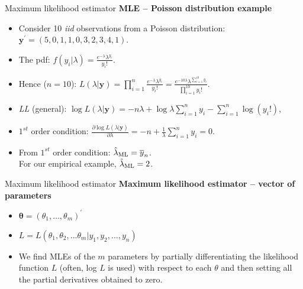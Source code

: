 \documentclass{beamer}
\begin{document}
\begin{frame}{Maximum likelihood estimator}
\textbf{MLE -- Poisson distribution example}\\ \smallskip
\begin{itemize}
    \item Consider 10 \textit{iid} observations from a Poisson distribution:\\$\bm{y}^{\prime}=(5,0,1,1,0,3,2,3,4,1)$.
    \smallskip
    \item The pdf: $f(y_i|\lambda) = \frac{e^{-\lambda}\lambda^{y_i}}{y_i!}$.
    \smallskip
    \item Hence ($n=10$): $L(\lambda|\bm{y})=\displaystyle\prod_{i=1}^{n} \frac{e^{-\lambda}\lambda^{y_i}}{y_i!} =\frac{e^{-10\lambda}\lambda^{\sum_{i=1}^{10}y_i}}{\prod_{i=1}^{10}y_i!}$.
    \smallskip
    \item \textit{LL} (general): $\log L(\lambda|\bm{y}) = -n \lambda + \log \lambda \displaystyle\sum_{i=1}^n y_i - \displaystyle\sum_{i=1}^n \log ({y_i !})$,
    \smallskip
    \item $1^{st}$ order condition:
$\frac{\partial \log L(\lambda|\bm{y}) }{\partial \lambda} = -n + \frac{1}{\lambda} \displaystyle\sum_{i=1}^n y_i = 0 $.
\smallskip
    \item From $1^{st}$ order condition: $\hat{\lambda}_{\textnormal{ML}}=\overline{y}_n$. \\For our empirical example, $\hat{\lambda}_{\textnormal{ML}}=2$.
\end{itemize}
\end{frame}
\begin{frame}{Maximum likelihood estimator}
\textbf{\textbf{Maximum likelihood estimator -- vector of parameters}}\\
\medskip
\begin{itemize}
\item $\bm{\theta} = (\theta_1, \dots , \theta_m)^{\prime}$
\medskip
\item $L=L(\theta_1, \theta_2, ... \theta_m | y_1, y_2, ... , y_n)$
\medskip
\item We find MLEs of the $m$ parameters by partially differentiating the likelihood function $L$ (often, log $L$ is used) with respect to each $\theta$ and then setting all the partial derivatives obtained to zero.
\end{itemize}
\end{frame}
\end{document}
